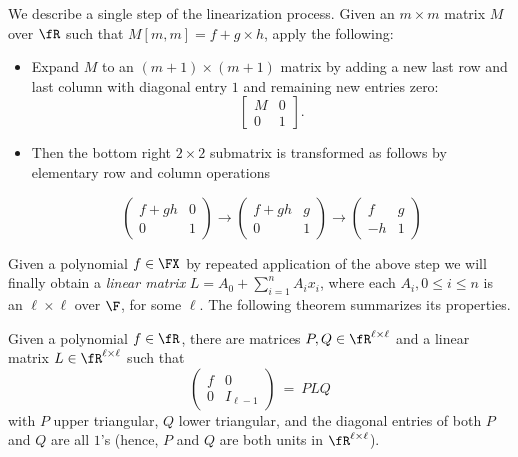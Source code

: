 We describe a single step of the linearization process. Given an
$m \times m$ matrix $M$ over $\fR$ such that $M[m,m]=f+g\times h$,
apply the following:
\begin{itemize}
\item Expand $M$ to an  $(m+1)\times (m+1)$ matrix by adding a new last
  row and last column with diagonal entry $1$ and remaining new entries
  zero:
\[
\left[
\begin{array}{c|c}
M & 0 \\
\hline
0 & 1
\end{array}
\right]. 
\]
\item Then the bottom right $2\times 2$ submatrix is transformed as
  follows by elementary row and column operations

\[
\left(
\begin{array}{cc}
f+gh & 0 \\
0 & 1
\end{array}
\right)\rightarrow
\left(
\begin{array}{cc}
f+gh & g \\
0 & 1
\end{array}
\right)\rightarrow
\left(
\begin{array}{cc}
f & g \\
-h & 1
\end{array}
\right)
\]

\end{itemize}

Given a polynomial $f\in\FX$ by repeated application of the above step
we will finally obtain a \emph{linear matrix} $L=A_0+\sum_{i=1}^n A_i
x_i$, where each $A_i, 0\le i\le n$ is an $\ell\times \ell$ over $\F$,
for some $\ell$. The following theorem summarizes its properties.

\begin{theorem}{\rm\cite{Cohnfir}}\label{higthm}
  Given a polynomial $f\in\fR$, there are matrices $P, Q\in\fR^{\ell \times \ell}$
  and a linear matrix $L\in\fR^{\ell\times \ell}$ such that
\begin{equation}\label{higeq}
%
\left(
\begin{array}{c|c}
f & 0 \\
\hline
0 & I_{\ell-1}
\end{array}
\right) ~=~PLQ
\end{equation}
with $P$ upper triangular, $Q$ lower triangular, and the diagonal
entries of both $P$ and $Q$ are all $1$'s (hence, $P$ and $Q$ are both
units in $\fR^{\ell \times \ell}$).
\end{theorem}

